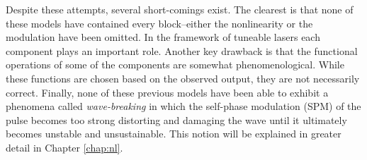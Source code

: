 Despite these attempts, several short-comings exist. The clearest is that none of these models have contained every block--either the nonlinearity or the modulation have been omitted. In the framework of tuneable lasers each component plays an important role. Another key drawback is that the functional operations of some of the components are somewhat phenomenological. While these functions are chosen based on the observed output, they are not necessarily correct. Finally, none of these previous models have been able to exhibit a phenomena called \emph{wave-breaking} in which the self-phase modulation (SPM) of the pulse becomes too strong distorting and damaging the wave until it ultimately becomes unstable and unsustainable. This notion will be explained in greater detail in Chapter \ref{chap:nl}. \\
